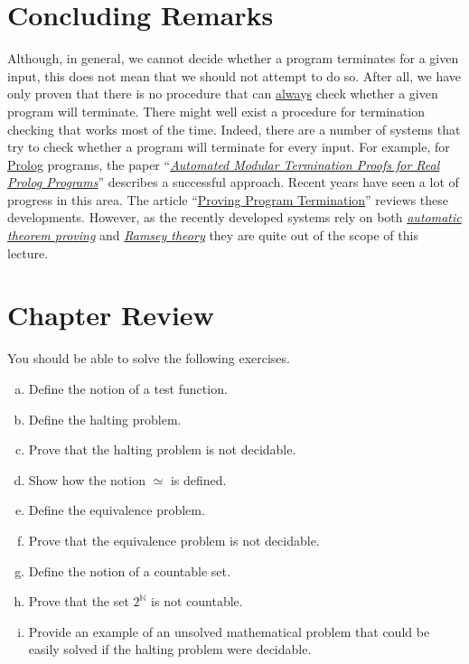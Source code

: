 \section{Concluding Remarks}
Although, in general, we cannot decide whether a program terminates for a given input, this does not mean
that we should not attempt to do so.
After all, we have only proven that there is no procedure that
can \underline{alwa}y\underline{s} check whether a given program will terminate.
There might well exist a
procedure for termination checking that works most of the time.
Indeed, there are a number of
systems that try to check whether a program will terminate for every input.
For example, for
\href{https://en.wikipedia.org/wiki/Prolog}{Prolog}
programs, the paper
``\href{http://link.springer.com/chapter/10.1007%2F3-540-61739-6_44}{\emph{Automated Modular Termination Proofs for Real Prolog Programs}}''
\cite{mueller:1996} describes a successful approach.
Recent years have seen a lot of progress in
this area.  The article 
``\href{http://dl.acm.org/citation.cfm?id=1941509}{{Proving Program Termination}}''
\cite{cook:2011} reviews these developments.
However, as the recently developed systems rely on both
\href{http://en.wikipedia.org/wiki/Automated_theorem_proving}{\emph{automatic theorem proving}} and
\href{http://en.wikipedia.org/wiki/Ramsey_theory}{\emph{Ramsey theory}} they are quite out of the
scope of this lecture.
\pagebreak

\section{Chapter Review}
You should be able to solve the following exercises.
\begin{enumerate}[(a)]
\item Define the notion of a test function.
\item Define the halting problem.
\item Prove that the halting problem is not decidable.
\item Show how the notion $\simeq$ is defined.
\item Define the equivalence problem.
\item Prove that the equivalence problem is not decidable.
\item Define the notion of a countable set.
\item Prove that the set $2^{\mathbb{N}}$ is not countable.
\item Provide an example of an unsolved mathematical problem that could be easily solved if the halting problem
      were decidable.
\end{enumerate}

